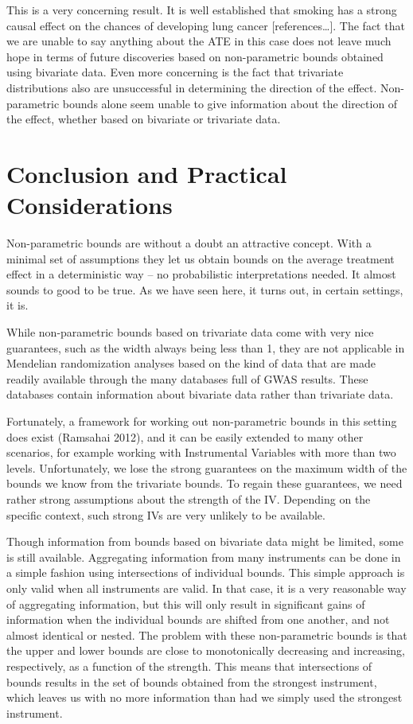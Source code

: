 \documentclass[
]{article}
\theoremstyle{plain}
\begin{document}
This is a very concerning result. It is well established that smoking has a strong causal effect on the chances of developing lung cancer {[}references\ldots{]}. The fact that we are unable to say anything about the ATE in this case does not leave much hope in terms of future discoveries based on non-parametric bounds obtained using bivariate data. Even more concerning is the fact that trivariate distributions also are unsuccessful in determining the direction of the effect. Non-parametric bounds alone seem unable to give information about the direction of the effect, whether based on bivariate or trivariate data.

\newpage

\hypertarget{conclusion-and-practical-considerations}{%
\section{Conclusion and Practical Considerations}\label{conclusion-and-practical-considerations}}

Non-parametric bounds are without a doubt an attractive concept. With a minimal set of assumptions they let us obtain bounds on the average treatment effect in a deterministic way -- no probabilistic interpretations needed. It almost sounds to good to be true. As we have seen here, it turns out, in certain settings, it is.

While non-parametric bounds based on trivariate data come with very nice guarantees, such as the width always being less than 1, they are not applicable in Mendelian randomization analyses based on the kind of data that are made readily available through the many databases full of GWAS results. These databases contain information about bivariate data rather than trivariate data.

Fortunately, a framework for working out non-parametric bounds in this setting does exist (Ramsahai 2012), and it can be easily extended to many other scenarios, for example working with Instrumental Variables with more than two levels. Unfortunately, we lose the strong guarantees on the maximum width of the bounds we know from the trivariate bounds. To regain these guarantees, we need rather strong assumptions about the strength of the IV. Depending on the specific context, such strong IVs are very unlikely to be available.

Though information from bounds based on bivariate data might be limited, some is still available. Aggregating information from many instruments can be done in a simple fashion using intersections of individual bounds. This simple approach is only valid when all instruments are valid. In that case, it is a very reasonable way of aggregating information, but this will only result in significant gains of information when the individual bounds are shifted from one another, and not almost identical or nested. The problem with these non-parametric bounds is that the upper and lower bounds are close to monotonically decreasing and increasing, respectively, as a function of the strength. This means that intersections of bounds results in the set of bounds obtained from the strongest instrument, which leaves us with no more information than had we simply used the strongest instrument.
\end{document}
